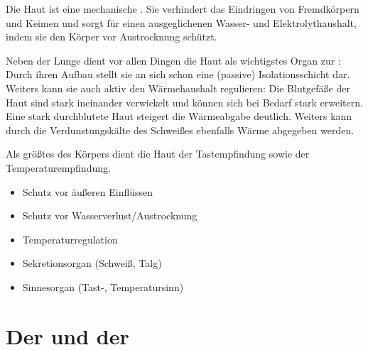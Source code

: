 {%
Die Haut ist eine mechanische . 
Sie verhindert das Eindringen von Fremdkörpern 
und Keimen 
und sorgt für einen ausgeglichenen Wasser- 
und Elektrolythaushalt, 
indem sie den Körper vor Austrocknung schützt.

Neben der Lunge dient vor allen Dingen  die Haut als
wichtigstes Organ zur : 
Durch ihren Aufbau stellt sie an sich schon 
eine (passive) Isolationsschicht dar. 
%
Weiters kann sie auch aktiv den Wärmehaushalt regulieren: 
%
Die Blutgefäße der Haut sind stark ineinander verwickelt 
und können sich bei Bedarf stark erweitern. 
%
Eine stark durchblutete Haut steigert die Wärmeabgabe deutlich. 
%
Weiters kann durch 
die Verdunstungskälte des Schweißes 
ebenfalls Wärme abgegeben werden.

Als größtes  des Körpers dient die Haut der
Tastempfindung sowie der Temperaturempfindung.



}
{
\begin{itemize}
  \item Schutz vor äußeren Einflüssen
  \item Schutz vor Wasserverlust/Austrocknung
  \item Temperaturregulation
  \item Sekretionsorgan (Schweiß, Talg)
  \item Sinnesorgan (Tast-, Temperatursinn)
\end{itemize}
}{}{}{}




\clearpage
\section{Der  und der }



